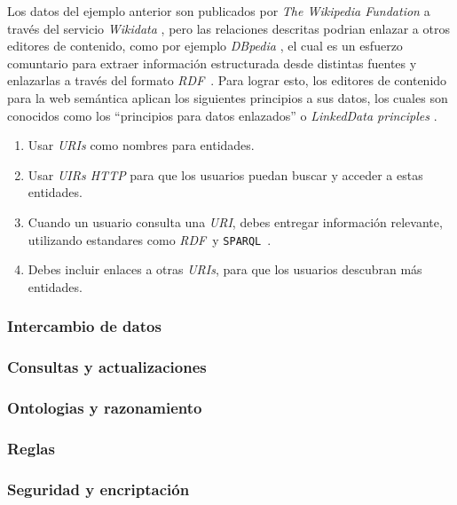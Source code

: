\documentclass[conference,compsoc]{IEEEtran}
\newcommand{\rdf}{\textit{RDF}\ }
\newcommand{\spql}{\texttt{SPARQL}\ }
\begin{document}
Los datos del ejemplo anterior son publicados por \textit{The Wikipedia Fundation} a través del servicio \textit{Wikidata}
\cite{vrandevcic2014wikidata}, pero las relaciones descritas podrian enlazar a otros editores de contenido,
como por ejemplo \textit{DBpedia} \cite{valsecchi2015dbpedia}, el cual es un esfuerzo comuntario para extraer
información estructurada desde distintas fuentes y enlazarlas a través del formato \rdf. Para lograr esto,
los editores de contenido para la web semántica aplican los siguientes principios a sus datos, los cuales
son conocidos como los ``principios para datos enlazados'' o \textit{LinkedData principles} \cite{bizer2011linked}.

\begin{enumerate}
    \item Usar \textit{URIs} como nombres para entidades.
    \item Usar \textit{UIRs HTTP} para que los usuarios puedan buscar y acceder a estas entidades.
    \item Cuando un usuario consulta una \textit{URI}, debes entregar información relevante, utilizando estandares como \rdf y \spql.
    \item Debes incluir enlaces a otras \textit{URIs}, para que los usuarios descubran más entidades.
\end{enumerate}

    \subsubsection{Intercambio de datos}

    \subsubsection{Consultas y actualizaciones}

    \subsubsection{Ontologias y razonamiento}

    \subsubsection{Reglas}

    \subsubsection{Seguridad y encriptación}
\end{document}
